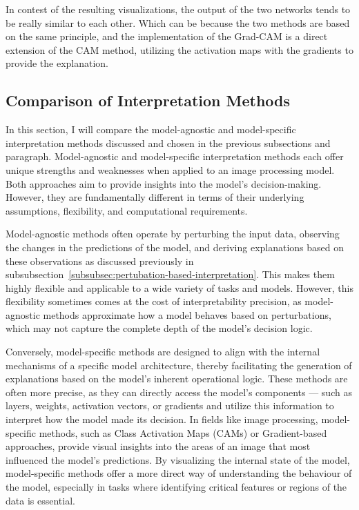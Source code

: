 In contest of the resulting visualizations, the output of the two networks tends to be really similar to each other.
Which can be because the two methods are based on the same principle, and the implementation of the Grad-CAM
is a direct extension of the CAM method, utilizing the activation maps with the gradients to provide the explanation.

\subsection{Comparison of Interpretation Methods}\label{subsec:evaluation-interpretation-methods}

In this section, I will compare the model-agnostic and model-specific interpretation methods discussed and chosen in the previous subsections
and paragraph.
Model-agnostic and model-specific interpretation methods each offer unique strengths and weaknesses when applied to
an image processing model.
Both approaches aim to provide insights into the model's decision-making.
However, they are fundamentally different in terms of their underlying assumptions, flexibility, and computational requirements.


Model-agnostic methods often operate by perturbing the input data, observing the changes in the  predictions of the model,
and deriving explanations based on these observations as discussed previously in subsubsection~\ref{subsubsec:pertubation-based-interpretation}.
This makes them highly flexible and applicable to a wide variety of tasks and models.
However, this flexibility sometimes comes at the cost of interpretability precision, as model-agnostic methods approximate
how a model behaves based on perturbations, which may not capture the complete depth of the model’s decision logic.

Conversely, model-specific methods are designed to align with the internal mechanisms of a specific model architecture,
thereby facilitating the generation of explanations based on the model's inherent operational logic.
These methods are often more precise, as they can directly access the model's components — such as layers,
weights, activation vectors, or gradients and utilize this information to interpret how the model made its decision.
In fields like image processing, model-specific methods, such as Class Activation Maps (CAMs) or Gradient-based approaches,
provide visual insights into the areas of an image that most influenced the model’s predictions.
By visualizing the internal state of the model, model-specific methods offer a more direct way of understanding the behaviour of the model,
especially in tasks where identifying critical features or regions of the data is essential.


